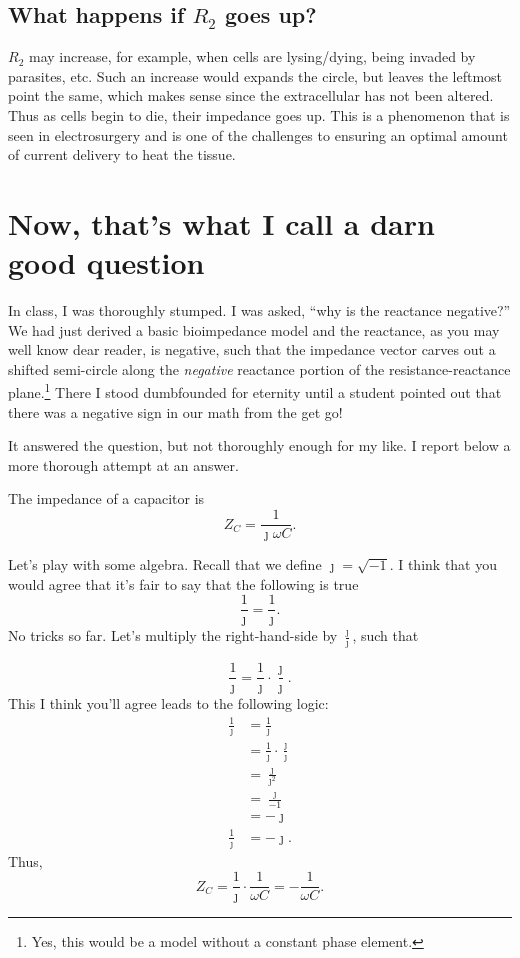 \documentclass[11pt]{book}
\begin{document}
\subsection{What happens if $R_2$ goes up?}
$R_2$ may increase, for example, when cells are lysing/dying, being invaded by parasites, etc. Such an increase would expands the circle, but leaves the leftmost point the same, which makes sense since the extracellular has not been altered. Thus as cells begin to die, their impedance goes up. This is a phenomenon that is seen in electrosurgery and is one of the challenges to ensuring an optimal amount of current delivery to heat the tissue.


\section{Now, that's what I call a darn good question}
In class, I was thoroughly stumped. I was asked, ``why is the reactance negative?'' We had just derived a basic bioimpedance model and the reactance, as you may well know dear reader, is negative, such that the impedance vector carves out a shifted semi-circle along the \textit{negative} reactance portion of the resistance-reactance plane.\footnote{Yes, this would be a model without a constant phase element.} There I stood dumbfounded for eternity until a student pointed out that there was a negative sign in our math from the get go! 

It answered the question, but not thoroughly enough for my like. I report below a more thorough attempt at an answer.

The impedance of a capacitor is
\begin{equation}
	Z_C = \frac{1}{\jmath \omega C}.
\end{equation}

Let's play with some algebra. Recall that we define $\jmath = \sqrt{-1}$. I think that you would agree that it's fair to say that the following is true
\begin{equation}
	\frac{1}{\jmath} = \frac{1}{\jmath}.
\end{equation}
No tricks so far. Let's multiply the right-hand-side by $\frac{\jmath}{\jmath}$, such that

\begin{equation}
	\frac{1}{\jmath} = \frac{1}{\jmath}\cdot \frac{\jmath}{\jmath}.
\end{equation}
This I think you'll agree leads to the following logic:
\begin{align}
	\frac{1}{\jmath} &= \frac{1}{\jmath} \\
	&= \frac{1}{\jmath}\cdot \frac{\jmath}{\jmath} \\
	&= \frac{\jmath}{\jmath^2} \\
	&= \frac{\jmath}{-1} \\
	&= -\jmath \\
	\frac{1}{\jmath} &=-\jmath.
\end{align}
Thus,
\begin{equation}
	Z_C = \frac{1}{\jmath}\cdot \frac{1}{\omega C} = - \frac{1}{\omega C}.
\end{equation}
\end{document}
